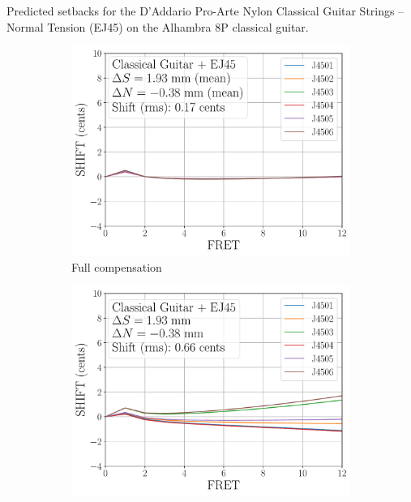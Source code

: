  \begin{table}%
  \centering
  \caption{\label{tbl:ej45_setbacks} Predicted setbacks for the D'Addario Pro-Arte Nylon Classical Guitar Strings -- Normal Tension (EJ45) on the Alhambra 8P classical guitar.}
  
 \end{table}%

 \begin{figure}
  \centering
  \begin{subfigure}[b]{0.8\textwidth}
   \centering
   \includegraphics[width=5.0in]{../figures/shift_classicalguitar_ej45_full}
   \caption{Full compensation}
   \label{fig:shift_classicalguitar_ej45_full}
  \end{subfigure}
  \par\vspace{0.25in}
  \begin{subfigure}[b]{0.8\textwidth}
   \centering
   \includegraphics[width=5.0in]{../figures/shift_classicalguitar_ej45_mean}

\end{subfigure}
\end{figure}
